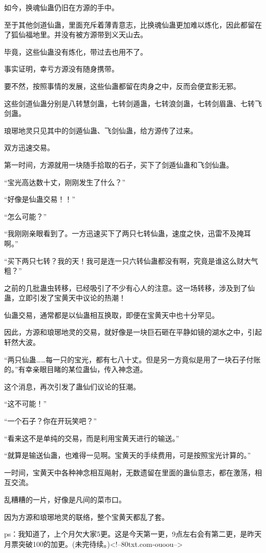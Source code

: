 \begin{this_body}
如今，换魂仙蛊仍旧在方源的手中。

至于其他剑道仙蛊，里面充斥着薄青意志，比换魂仙蛊更加难以炼化，因此都留在了狐仙福地里。并没有被方源带到义天山去。

毕竟，这些仙蛊没有炼化，带过去也用不了。

事实证明，幸亏方源没有随身携带。

要不然，按照事情的发展，这些仙蛊都留在肉身之中，反而会便宜影无邪。

这些剑道仙蛊分别是八转慧剑蛊，七转剑遁蛊，七转浪剑蛊，七转剑眉蛊、七转飞剑蛊。

琅琊地灵只见其中的剑遁仙蛊、飞剑仙蛊，给方源传了过来。

双方迅速交易。

第一时间，方源就用一块随手拾取的石子，买下了剑遁仙蛊和飞剑仙蛊。

“宝光高达数十丈，刚刚发生了什么？”

“好像是仙蛊交易！！”

“怎么可能？”

“我刚刚亲眼看到了。一方迅速买下了两只七转仙蛊，速度之快，迅雷不及掩耳啊。”

“买下两只七转？我的天！我可是连一只六转仙蛊都没有啊，究竟是谁这么财大气粗？”

之前的几批蛊虫转移，已经吸引了不少有心人的注意。这一场转移，涉及到了仙蛊，立即引发了宝黄天中议论的热潮！

仙蛊交易，通常都是以仙蛊相互换取，即便在宝黄天中也十分罕见。

因此，方源和琅琊地灵的交易，就好像是一块巨石砸在平静如镜的湖水之中，引起轩然大波。

“两只仙蛊……每一只的宝光，都有七八十丈。但是另一方竟似是用了一块石子付账的。”有幸亲眼目睹的某位蛊仙，传入神念道。

这个消息，再次引发了蛊仙们议论的狂潮。

“这不可能！”

“一个石子？你在开玩笑吧？”

“看来这不是单纯的交易，而是利用宝黄天进行的输送。”

“就算是输送仙蛊，也难得一见啊。宝黄天的手续费用，可是按照宝光计算的。”

一时间，宝黄天中各种神念相互飚射，无数遗留在里面的蛊仙意志，都在激荡，相互交流。

乱糟糟的一片，好像是凡间的菜市口。

因为方源和琅琊地灵的联络，整个宝黄天都乱了套。

ps：我知道了，上个月欠大家5更。这是今天第一更，9点左右会有第二更，是昨天月票突破100的加更。(未完待续。)<!--80txt.com-ouoou-->

\end{this_body}

